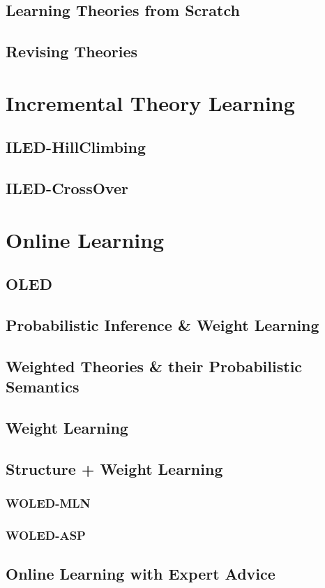 \documentclass[a4paper,twoside,11pt]{article}
\theoremstyle{definition}
\begin{document}
\subsection{Learning Theories from Scratch}
\subsection{Revising Theories}
\section{Incremental Theory Learning}
\subsection{ILED-HillClimbing}
\subsection{ILED-CrossOver}
\section{Online Learning}
\subsection{OLED}
\subsection{Probabilistic Inference \& Weight Learning}
\subsection{Weighted Theories \& their Probabilistic Semantics}
\subsection{Weight Learning}
\subsection{Structure + Weight Learning}
\subsubsection{WOLED-MLN}
\subsubsection{WOLED-ASP}
\subsection{Online Learning with Expert Advice}
\end{document}
